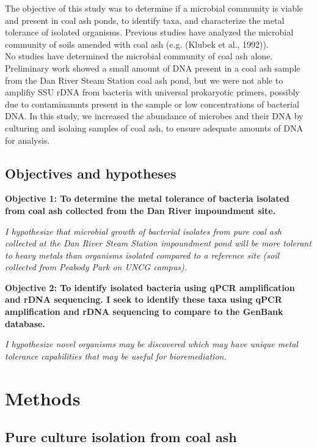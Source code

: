 \documentclass[ms]{uncgdissertationexp}
\theoremstyle{plain}
\theoremstyle{definition}
\theoremstyle{remark}
\begin{document}
  The objective of this study was to determine if a microbial community is
  viable and present in coal ash ponds, to identify taxa, and characterize
  the metal tolerance of isolated organisms. Previous studies have
  analyzed the microbial community of soils amended with coal ash (e.g.
  (Klubek et al., 1992)).\\
  No studies have determined the microbial community of coal ash alone.
  Preliminary work showed a small amount of DNA present in a coal ash
  sample from the Dan River Steam Station coal ash pond, but we were not
  able to amplifiy SSU rDNA from bacteria with universal prokaryotic
  primers, possibly due to contaminamnts present in the sample or low
  concentrations of bacterial DNA. In this study, we increased the
  abundance of microbes and their DNA by culturing and isolaing samples of
  coal ash, to ensure adequate amounts of DNA for analysis.
  
  \subsection{Objectives and hypotheses}\label{objectives-and-hypotheses}
  
  \textbf{Objective 1: To determine the metal tolerance of bacteria
  isolated from coal ash collected from the Dan River impoundment site.}
  
  \emph{I hypothesize that microbial growth of bacterial isolates from
  pure coal ash collected at the Dan River Steam Station impoundment pond
  will be more tolerant to heavy metals than organisms isolated compared
  to a reference site (soil collected from Peabody Park on UNCG campus).}
  
  \textbf{Objective 2: To identify isolated bacteria using qPCR
  amplification and rDNA sequencing. I seek to identify these taxa using
  qPCR amplification and rDNA sequencing to compare to the GenBank
  database.}
  
  \emph{I hypothesize novel organisms may be discovered which may have
  unique metal tolerance capabilities that may be useful for
  bioremediation.}
  
  \section{Methods}\label{methods-1}
  
  \subsection{Pure culture isolation from coal
  ash}\label{pure-culture-isolation-from-coal-ash}
  
\end{document}
